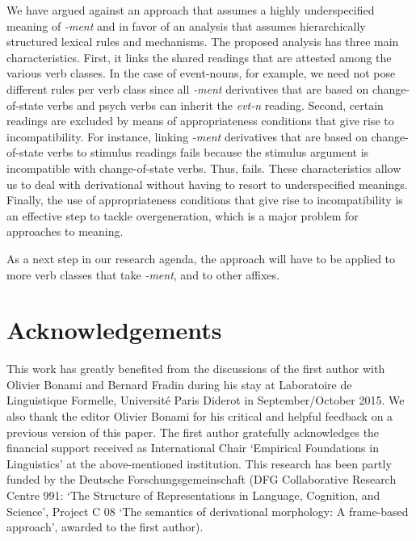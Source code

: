 \documentclass[output=paper]{langsci/langscibook}
\begin{document}
We have argued against an approach that assumes a highly underspecified meaning of \textit{-ment} and in favor of an analysis that assumes hierarchically structured lexical rules and  mechanisms. The proposed analysis has three main characteristics. First, it links the shared readings that are attested among the various verb classes. In the case of event-nouns, for example, we need not pose different rules per verb class since all \textit{-ment} derivatives that are based on change-of-state verbs and psych verbs can inherit the \textit{evt-n} reading. Second, certain readings are excluded by means of appropriateness conditions that give rise to incompatibility. For instance, linking \textit{-ment} derivatives that are based on change-of-state verbs to stimulus readings fails because the stimulus argument is incompatible with change-of-state verbs. Thus,  fails. These characteristics allow us to deal with derivational  without having to resort to underspecified meanings. Finally, the use of appropriateness conditions that give rise to incompatibility is an effective step to tackle overgeneration, which is a major problem for  approaches to meaning.

As a next step in our research agenda, the approach will have to be applied to more verb classes that take \textit{-ment}, and to other affixes.

\section*{Acknowledgements}

This work has greatly benefited from the discussions of the first author with Olivier Bonami and Bernard Fradin during his stay at Laboratoire de Linguistique Formelle, Universit\'{e} Paris Diderot in September/October 2015. We also thank the editor Olivier Bonami for his critical and helpful feedback on a previous version of this paper. The first author gratefully acknowledges the financial support received as International Chair `Empirical Foundations in Linguistics' at the above-mentioned institution. This research has been partly funded by the Deutsche Forschungsgemeinschaft (DFG Collaborative Research Centre 991: `The Structure of Representations in Language, Cognition, and Science', Project C 08 `The semantics of derivational morphology: A frame-based approach', awarded to the first author).


{\sloppy
    \printbibliography[heading=subbibliography,notkeyword=this]
}
\end{document}
